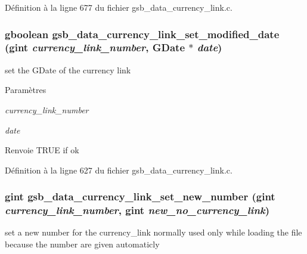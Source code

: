 Définition à la ligne 677 du fichier gsb\_\-data\_\-currency\_\-link.c.

\subsubsection[{gsb\_\-data\_\-currency\_\-link\_\-set\_\-modified\_\-date}]{\setlength{\rightskip}{0pt plus 5cm}gboolean gsb\_\-data\_\-currency\_\-link\_\-set\_\-modified\_\-date (gint {\em currency\_\-link\_\-number}, \/  GDate $\ast$ {\em date})}\label{gsb__data__currency__link_8h_a45a0f10f5738e9fc8118bd99442e6366}
set the GDate of the currency link


\begin{DoxyParams}{Paramètres}
\item[{\em currency\_\-link\_\-number}]\item[{\em date}]\end{DoxyParams}
\begin{DoxyReturn}{Renvoie}
TRUE if ok 
\end{DoxyReturn}


Définition à la ligne 627 du fichier gsb\_\-data\_\-currency\_\-link.c.

\subsubsection[{gsb\_\-data\_\-currency\_\-link\_\-set\_\-new\_\-number}]{\setlength{\rightskip}{0pt plus 5cm}gint gsb\_\-data\_\-currency\_\-link\_\-set\_\-new\_\-number (gint {\em currency\_\-link\_\-number}, \/  gint {\em new\_\-no\_\-currency\_\-link})}\label{gsb__data__currency__link_8h_afcae5a85a8cd075e218f6eb7d3a4669a}
set a new number for the currency\_\-link normally used only while loading the file because the number are given automaticly


